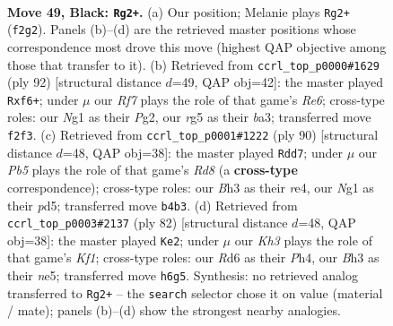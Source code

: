 \documentclass[11pt]{article}
\begin{document}
\clearpage

\begin{figure}[p]\centering
\begin{subfigure}{0.46\textwidth}\centering
\resizebox{\linewidth}{!}{%
\newchessgame
\chessboard[
  setfen={8/7p/3r1p1k/6R1/1p2P1P1/6Kb/5r2/6n1 b - - 2 49},
  showmover=false,
  pgfstyle=straightmove, color=movearrow, markmove={f2-g2}
]}
\caption{}
\end{subfigure}\hfill
\begin{subfigure}{0.46\textwidth}\centering
\resizebox{\linewidth}{!}{%
\newchessgame
\chessboard[
  setfen={5r2/8/3PRp2/5k1p/3B4/b1R2Pp1/4K1P1/1r6 w - - 3 47},
  showmover=false,
  pgfstyle=straightmove, color=movearrow, markmove={e6-f6}
]}
\caption{}
\end{subfigure}
\\[4pt]
\begin{subfigure}{0.46\textwidth}\centering
\resizebox{\linewidth}{!}{%
\newchessgame
\chessboard[
  setfen={3R4/5Rp1/1P4kp/3p4/4rP2/7K/7P/6r1 w - - 6 46},
  showmover=false,
  pgfstyle=straightmove, color=movearrow, markmove={d8-d7}
]}
\caption{}
\end{subfigure}\hfill
\begin{subfigure}{0.46\textwidth}\centering
\resizebox{\linewidth}{!}{%
\newchessgame
\chessboard[
  setfen={8/8/8/4np2/kp1r3P/1R4P1/5P2/2N2K2 w - - 1 42},
  showmover=false,
  pgfstyle=straightmove, color=movearrow, markmove={f1-e2}
]}
\caption{}
\end{subfigure}
\caption{\textbf{Move 49, Black: \texttt{Rg2+}.} (a) Our position; Melanie plays \texttt{Rg2+} (\texttt{f2g2}). Panels (b)--(d) are the retrieved master positions whose correspondence most drove this move (highest QAP objective among those that transfer to it). (b) Retrieved from \texttt{ccrl\_top\_p0000\#1629} (ply 92) [structural distance $d$=49, QAP obj=42]: the master played \texttt{Rxf6+}; under $\mu$ our \emph{Rf7} plays the role of that game's \emph{Re6}; cross-type roles: our \emph{N}g1 as their \emph{P}g2, our \emph{r}g5 as their \emph{b}a3; transferred move \texttt{f2f3}. (c) Retrieved from \texttt{ccrl\_top\_p0001\#1222} (ply 90) [structural distance $d$=48, QAP obj=38]: the master played \texttt{Rdd7}; under $\mu$ our \emph{Pb5} plays the role of that game's \emph{Rd8} (a \textbf{cross-type} correspondence); cross-type roles: our \emph{B}h3 as their \emph{r}e4, our \emph{N}g1 as their \emph{p}d5; transferred move \texttt{b4b3}. (d) Retrieved from \texttt{ccrl\_top\_p0003\#2137} (ply 82) [structural distance $d$=48, QAP obj=38]: the master played \texttt{Ke2}; under $\mu$ our \emph{Kh3} plays the role of that game's \emph{Kf1}; cross-type roles: our \emph{R}d6 as their \emph{P}h4, our \emph{B}h3 as their \emph{n}e5; transferred move \texttt{h6g5}. Synthesis: no retrieved analog transferred to \texttt{Rg2+} -- the \texttt{search} selector chose it on value (material / mate); panels (b)--(d) show the strongest nearby analogies.}
\label{fig:thought-m97}
\end{figure}
\end{document}

